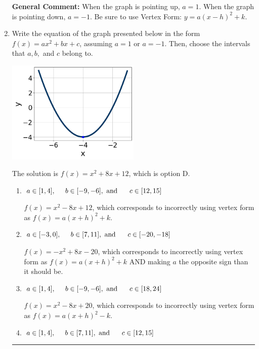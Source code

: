 \documentclass{extbook}[14pt]
\newcommand{\litem}[1]{\item #1

\rule{\textwidth}{0.4pt}}
\begin{document}
\begin{enumerate}
{\textbf{General Comment:} When the graph is pointing up, $a=1$. When the graph is pointing down, $a=-1$. Be sure to use Vertex Form: $y = a(x-h)^2+k$.
}
\litem{
Write the equation of the graph presented below in the form $f(x)=ax^2+bx+c$, assuming  $a=1$ or $a=-1$. Then, choose the intervals that $a, b,$ and $c$ belong to.

\begin{center}
    \includegraphics[width=0.5\textwidth]{../Figures/quadraticGraphToEquationCopyC.png}
\end{center}



The solution is \( f(x) = x^{2} +8 x + 12 \), which is option D.\begin{enumerate}[label=\Alph*.]
\item \( a \in [1, 4], \hspace*{5mm} b \in [-9, -6], \text{ and } \hspace*{5mm} c \in [12, 15] \)

$f(x)=x^{2} -8 x + 12$, which corresponds to incorrectly using vertex form as $f(x) = a(x+h)^2+k$.
\item \( a \in [-3, 0], \hspace*{5mm} b \in [7, 11], \text{ and } \hspace*{5mm} c \in [-20, -18] \)

$f(x)=-x^{2} +8 x -20$, which corresponds to incorrectly using vertex form as $f(x) = a(x+h)^2+k$ AND making $a$ the opposite sign than it should be.
\item \( a \in [1, 4], \hspace*{5mm} b \in [-9, -6], \text{ and } \hspace*{5mm} c \in [18, 24] \)

$f(x)=x^{2} -8 x + 20$, which corresponds to incorrectly using vertex form as $f(x) = a(x+h)^2 - k$.
\item \( a \in [1, 4], \hspace*{5mm} b \in [7, 11], \text{ and } \hspace*{5mm} c \in [12, 15] \)


\end{enumerate}}
\end{enumerate}
\end{document}
